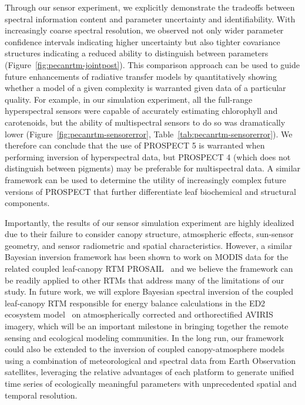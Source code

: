 Through our sensor experiment, we explicitly demonstrate the tradeoffs between spectral information content and parameter uncertainty and identifiability.
With increasingly coarse spectral resolution, we observed not only wider parameter confidence intervals indicating higher uncertainty but also tighter covariance structures indicating a reduced ability to distinguish between parameters (Figure~\ref{fig:pecanrtm-jointpost}).
This comparison approach can be used to guide future enhancements of radiative transfer models by quantitatively showing whether a model of a given complexity is warranted given data of a particular quality.
For example, in our simulation experiment, all the full-range hyperspectral sensors were capable of accurately estimating chlorophyll and carotenoids, but the ability of multispectral sensors to do so was dramatically lower (Figure~\ref{fig:pecanrtm-sensorerror}, Table~\ref{tab:pecanrtm-sensorerror}).
We therefore can conclude that the use of PROSPECT 5 is warranted when performing inversion of hyperspectral data, but PROSPECT 4 (which does not distinguish between pigments) may be preferable for multispectral data.
A similar framework can be used to determine the utility of increasingly complex future versions of PROSPECT that further differentiate leaf biochemical and structural components.

Importantly, the results of our sensor simulation experiment are highly idealized due to their failure to consider canopy structure, atmospheric effects, sun-sensor geometry, and sensor radiometric and spatial characteristics.
However, a similar Bayesian inversion framework has been shown to work on MODIS data for the related coupled leaf-canopy RTM PROSAIL~\cite{zhang_2005_estimating,zhang_2006_characterization,zhang_2009_satellite,zhang_2012_estimating} and we believe the framework can be readily applied to other RTMs that address many of the limitations of our study.
In future work, we will explore Bayesian spectral inversion of the coupled leaf-canopy RTM responsible for energy balance calculations in the ED2 ecosystem model~\cite{medvigy_2009_mechanistic} on atmospherically corrected and orthorectified AVIRIS imagery,
which will be an important milestone in bringing together the remote sensing and ecological modeling communities.
In the long run, our framework could also be extended to the inversion of coupled canopy-atmosphere models using a combination of meteorological and spectral data from Earth Observation satellites,
leveraging the relative advantages of each platform to generate unified time series of ecologically meaningful parameters with unprecedented spatial and temporal resolution.

